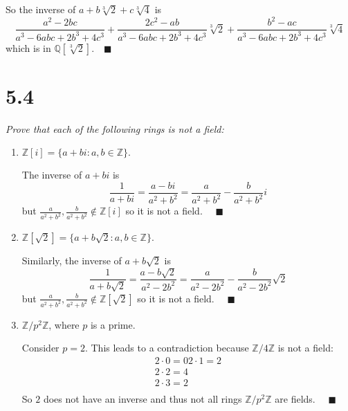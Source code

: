 \documentclass[12pt]{article}
\newcommand{\Z}{\mathbb{Z}}
\newcommand{\Q}{\mathbb{Q}}
\newcommand{\qed}{\quad \blacksquare}
\begin{document}
\begin{enumerate}
                    So the inverse of $a+ b\sqrt[3]{2}+c\sqrt[3]{4}$ is 
                    \[\frac{a^2 - 2bc}{a^3 - 6abc + 2b^3 + 4c^3} +  \frac{2c^2 - ab}{a^3 - 6abc + 2b^3 + 4c^3}\sqrt[3]{2} + \frac{b^2 - ac}{a^3 - 6abc + 2b^3 + 4c^3}\sqrt[3]{4}\]
                    which is in $\Q[\sqrt[3]{2}]. \qed$
                \color{black}
        \end{enumerate}

\pagebreak

\section*{5.4}
    \emph{Prove that each of the following rings is not a field:}
    \begin{enumerate}
        \item $\Z[i] = \{a+ bi : a, b \in \Z\}.$
        
            \color{blue}
                The inverse of $a + bi$ is 
                \[\frac{1}{a + bi} = \frac{a - bi}{a^2 + b^2} = \frac{a}{a^2 + b^2} - \frac{b}{a^2 + b^2}i\]
                but $\frac{a}{a^2 + b^2}, \frac{b}{a^2 + b^2} \not \in \Z[i]$ so it is not a field. $\qed$
            \color{black}

        \item $\Z[\sqrt 2] = \{a + b\sqrt 2: a, b \in \Z\}.$
            
            \color{blue}
                Similarly, the inverse of $a + b\sqrt 2$ is 
                \[\frac{1}{a + b\sqrt 2} = \frac{a - b\sqrt 2}{a^2 - 2b^2} = \frac{a}{a^2 - 2b^2} - \frac{b}{a^2 - 2b^2}\sqrt 2\]
                but $\frac{a}{a^2 + b^2}, \frac{b}{a^2 + b^2} \not \in \Z[\sqrt 2]$ so it is not a field. $\qed$
            \color{black}

        \item $\Z/p^2\Z$, where $p$ is a prime.

            \color{blue}
                Consider $p = 2$. This leads to a contradiction because $\Z/4\Z$ is not a field: 
                    \begin{align*}
                        2 \cdot 0 = 0
                        2\cdot 1 = 2\\
                        2 \cdot 2 = 4\\
                        2\cdot 3 = 2\\
                    \end{align*}
                    So $2$ does not have an inverse and thus not all rings $\Z/p^2\Z$ are fields. $\qed$
            \color{black}


\end{enumerate}
\end{document}
